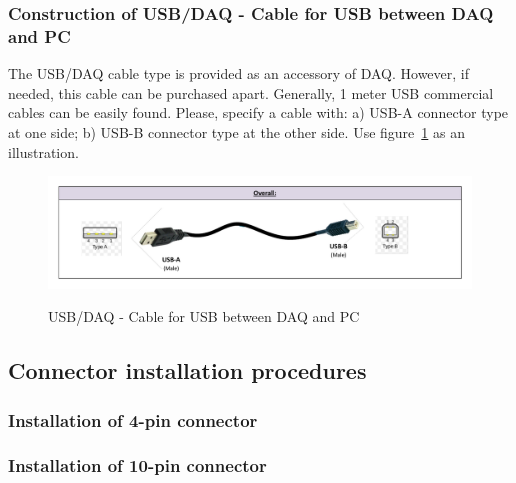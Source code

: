 \subsubsection{Construction of USB/DAQ - Cable for USB between DAQ and PC} \label{CONSTRUCTION:USBDAQ}
The USB/DAQ cable type is provided as an accessory of DAQ. However, if needed, this cable can be purchased apart. Generally, 1 meter USB commercial cables can be easily found. Please, specify a cable with: a) USB-A connector type at one side; b) USB-B connector type at the other side. Use figure~\ref{FIG:USBDAQconstruction} as an illustration.
\begin{figure}
  \centering
  \includegraphics[angle=90,width=1\columnwidth]{figs/body03/FIGUSBDAQconstruction.pdf}\\
  \caption[USB/DAQ - Cable for USB between DAQ and PC]{USB/DAQ - Cable for USB between DAQ and PC}
  \label{FIG:USBDAQconstruction}
\end{figure}

\subsection{Connector installation procedures}
\subsubsection{Installation of 4-pin connector} \label{CRIMPING4pin}
\subsubsection{Installation of 10-pin connector} \label{CRIMPING10pin}
